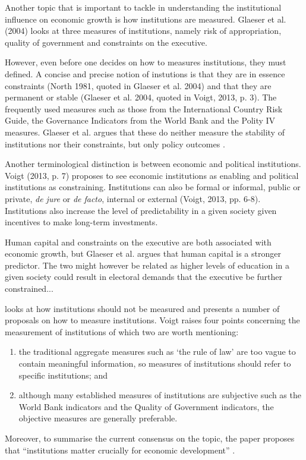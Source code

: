 \documentclass{article}\usepackage{graphicx, color}
\begin{document}
Another topic that is important to tackle in understanding the institutional
influence on economic growth is how institutions are measured. Glaeser
et al. (2004) looks at three measures of institutions, namely risk
of appropriation, quality of government and constraints on the executive.

However, even before one decides on how to measures institutions,
they must defined. A concise and precise notion of instutions is that
they are in essence constraints (North 1981, quoted in Glaeser et
al. 2004) and that they are permanent or stable (Glaeser et al. 2004,
quoted in Voigt, 2013, p. 3). The frequently used measures such as
those from the International Country Risk Guide, the Governance Indicators
from the World Bank \citep{kaufmann2010theworldwide} and the Polity
IV measures. Glaeser et al. argues that these do neither measure the
stability of institutions nor their constraints, but only policy outcomes
\citet[p. 4]{voigt2013hownot}.

Another terminological distinction is between economic and political
institutions. Voigt (2013, p. 7) proposes to see economic institutions
as enabling and political institutions as constraining. Institutions
can also be formal or informal, public or private, \emph{de jure }or
\emph{de facto}, internal or external\emph{ }(Voigt, 2013, pp. 6-8).
Institutions also increase the level of predictability in a given
society given incentives to make long-term investments.

Human capital and constraints on the executive are both associated
with economic growth, but Glaeser et al. argues that human capital
is a stronger predictor. The two might however be related as higher
levels of education in a given society could result in electoral demands
that the executive be further constrained... 

\citet{voigt2013hownot} looks at how institutions should not be measured
and presents a number of proposals on how to measure institutions.
Voigt raises four points concerning the measurement of institutions
of which two are worth mentioning:
\begin{enumerate}
\item the traditional aggregate measures such as \textquoteleft{}the rule
of law\textquoteright{} are too vague to contain meaningful information,
so measures of institutions should refer to specific institutions;
and
\item although many established measures of institutions are subjective
such as the World Bank indicators and the Quality of Government indicators,
the objective measures are generally preferable.
\end{enumerate}
Moreover, to summarise the current consensus on the topic, the paper
proposes that ``institutions matter crucially for economic development''
\citeyearpar[p. 1]{voigt2013hownot}.
\end{document}
